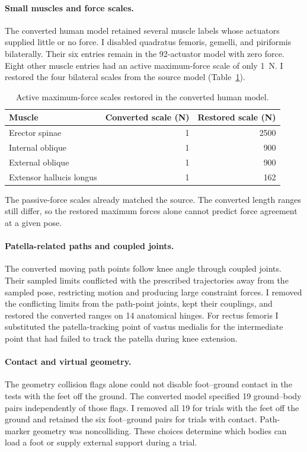 \paragraph{Small muscles and force scales.}
The converted human model retained several muscle labels whose actuators supplied little or no force. I disabled quadratus femoris, gemelli, and piriformis bilaterally. Their six entries remain in the 92-actuator model with zero force. Eight other muscle entries had an active maximum-force scale of only \qty{1}{\newton}. I restored the four bilateral scales from the source model (Table~\ref{tab:app_force_scale_repairs}).

\begin{table}[htbp]
\centering
\caption{Active maximum-force scales restored in the converted human model.}
\label{tab:app_force_scale_repairs}
\begin{tabular}{@{}lrr@{}}
\toprule
Muscle & Converted scale (\unit{\newton}) & Restored scale (\unit{\newton}) \\
\midrule
Erector spinae & 1 & 2500 \\
Internal oblique & 1 & 900 \\
External oblique & 1 & 900 \\
Extensor hallucis longus & 1 & 162 \\
\bottomrule
\end{tabular}
\end{table}

The passive-force scales already matched the source. The converted length ranges still differ, so the restored maximum forces alone cannot predict force agreement at a given pose.

\paragraph{Patella-related paths and coupled joints.}
The converted moving path points follow knee angle through coupled joints. Their sampled limits conflicted with the prescribed trajectories away from the sampled pose, restricting motion and producing large constraint forces. I removed the conflicting limits from the path-point joints, kept their couplings, and restored the converted ranges on 14 anatomical hinges. For rectus femoris I substituted the patella-tracking point of vastus medialis for the intermediate point that had failed to track the patella during knee extension.

\paragraph{Contact and virtual geometry.}
The geometry collision flags alone could not disable foot--ground contact in the tests with the feet off the ground. The converted model specified 19 ground--body pairs independently of those flags. I removed all 19 for trials with the feet off the ground and retained the six foot--ground pairs for trials with contact. Path-marker geometry was noncolliding. These choices determine which bodies can load a foot or supply external support during a trial.

